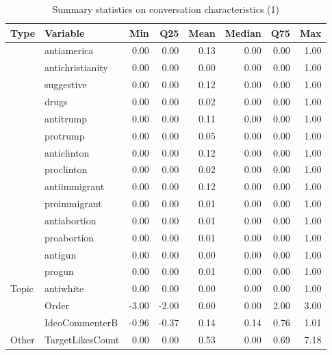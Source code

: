 \begin{table}[!h]
\centering
\caption{\label{tab:summ-tab2}Summary statistics on conversation characteristics (1)}
\centering
\begin{tabular}[t]{llrrrrrr}
\toprule
Type & Variable & Min & Q25 & Mean & Median & Q75 & Max\\
\midrule
 & antiamerica & 0.00 & 0.00 & 0.13 & 0.00 & 0.00 & 1.00\\
\cmidrule{2-8}
 & antichristianity & 0.00 & 0.00 & 0.00 & 0.00 & 0.00 & 1.00\\
\cmidrule{2-8}
 & suggestive & 0.00 & 0.00 & 0.12 & 0.00 & 0.00 & 1.00\\
\cmidrule{2-8}
 & drugs & 0.00 & 0.00 & 0.02 & 0.00 & 0.00 & 1.00\\
\cmidrule{2-8}
 & antitrump & 0.00 & 0.00 & 0.11 & 0.00 & 0.00 & 1.00\\
\cmidrule{2-8}
 & protrump & 0.00 & 0.00 & 0.05 & 0.00 & 0.00 & 1.00\\
\cmidrule{2-8}
 & anticlinton & 0.00 & 0.00 & 0.12 & 0.00 & 0.00 & 1.00\\
\cmidrule{2-8}
 & proclinton & 0.00 & 0.00 & 0.02 & 0.00 & 0.00 & 1.00\\
\cmidrule{2-8}
 & antiimmigrant & 0.00 & 0.00 & 0.12 & 0.00 & 0.00 & 1.00\\
\cmidrule{2-8}
 & proimmigrant & 0.00 & 0.00 & 0.01 & 0.00 & 0.00 & 1.00\\
\cmidrule{2-8}
 & antiabortion & 0.00 & 0.00 & 0.01 & 0.00 & 0.00 & 1.00\\
\cmidrule{2-8}
 & proabortion & 0.00 & 0.00 & 0.01 & 0.00 & 0.00 & 1.00\\
\cmidrule{2-8}
 & antigun & 0.00 & 0.00 & 0.00 & 0.00 & 0.00 & 1.00\\
\cmidrule{2-8}
 & progun & 0.00 & 0.00 & 0.01 & 0.00 & 0.00 & 1.00\\
\cmidrule{2-8}
\multirow{-15}{*}{\raggedright\arraybackslash Topic} & antiwhite & 0.00 & 0.00 & 0.00 & 0.00 & 0.00 & 1.00\\
\cmidrule{1-8}
 & Order & -3.00 & -2.00 & 0.00 & 0.00 & 2.00 & 3.00\\
\cmidrule{2-8}
 & IdeoCommenterB & -0.96 & -0.37 & 0.14 & 0.14 & 0.76 & 1.01\\
\cmidrule{2-8}
\multirow{-3}{*}{\raggedright\arraybackslash Other} & TargetLikesCount & 0.00 & 0.00 & 0.53 & 0.00 & 0.69 & 7.18\\
\bottomrule
\end{tabular}
\end{table}
